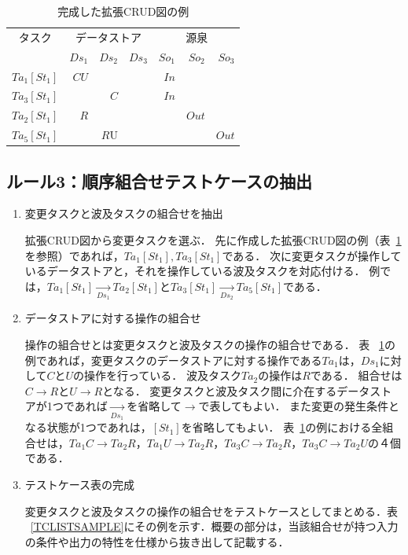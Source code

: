 \begin{table}[t]
  \centering
  \caption{完成した拡張CRUD図の例}
    \begin{tabular}{r|r|r|r|r|r|r}
    \multicolumn{1}{c|}{タスク} & \multicolumn{3}{c|}{データストア} & \multicolumn{3}{c}{源泉} \\
\cline{2-7}    \multicolumn{1}{c|}{} & $Ds_1$ & $Ds_2$ & $Ds_3$ & $So_1$ & $So_2$ & $So_3$ \\
    \hline
    \hline
    $Ta_1[St_1]$ & $CU$ &   &   & $In$ &   &  \\
    \hline
    $Ta_3[St_1]$ &   & $C$ &   & $In$ &   &  \\
    \hline
    $Ta_2[St_1]$ & $R$ &   &   &   & $Out$ &  \\
    \hline
    $Ta_5[St_1]$ &   & $R$U &   &   &   & $Out$ \\
    \end{tabular}%
  \label{excrud}%
\end{table}%

\subsection{ルール3：順序組合せテストケースの抽出}
\begin{enumerate}
\item 変更タスクと波及タスクの組合せを抽出

拡張CRUD図から変更タスクを選ぶ．
先に作成した拡張CRUD図の例（表~\ref{excrud}を参照）であれば，$Ta_1[St_1],Ta_3[St_1]$である．
次に変更タスクが操作しているデータストアと，それを操作している波及タスクを対応付ける．
例では，$Ta_1[St_1]  \xrightarrow[Ds_1]{} Ta_2[St_1]$と$Ta_3[St_1]  \xrightarrow[Ds_2]{}  Ta_5[St_1]$である．
\item データストアに対する操作の組合せ

操作の組合せとは変更タスクと波及タスクの操作の組合せである．
表 ~\ref{excrud}の例であれば，変更タスクのデータストアに対する操作である$Ta_1$は，$Ds_1$に対して$C$と$U$の操作を行っている．
波及タスク$Ta_2$の操作は$R$である．
組合せは$C  \rightarrow R$と$U  \rightarrow R$となる．
変更タスクと波及タスク間に介在するデータストアが1つであれば$\xrightarrow[Ds_1]{}$を省略して$\rightarrow$で表してもよい．
また変更の発生条件となる状態が1つであれは，$[St_1]$を省略してもよい．
表~\ref{excrud}の例における全組合せは，$Ta_1C \rightarrow Ta_2R$，$Ta_1U \rightarrow Ta_2R$，$Ta_3C \rightarrow Ta_2R$，$Ta_3C \rightarrow Ta_2U$の４個である．

\item テストケース表の完成

変更タスクと波及タスクの操作の組合せをテストケースとしてまとめる．表 ~\ref{TCLISTSAMPLE}にその例を示す．概要の部分は，当該組合せが持つ入力の条件や出力の特性を仕様から抜き出して記載する．
\end{enumerate}

